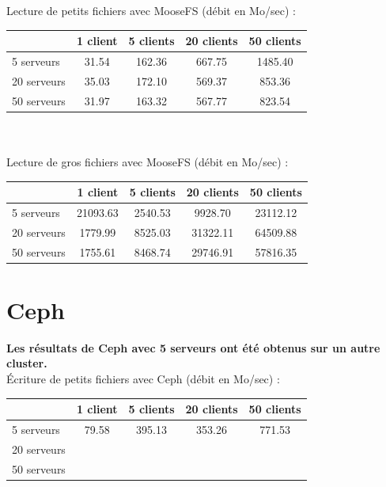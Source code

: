 \documentclass[12pt]{report}
\begin{document}
			Lecture de petits fichiers avec MooseFS (débit en Mo/sec) :

			\begin{tabular}{|l|c|c|c|c|}
				\hline
				& 1 client & 5 clients & 20 clients & 50 clients \\
				\hline
				5 serveurs & 31.54 & 162.36 & 667.75 & 1485.40 \\
				\hline
				20 serveurs & 35.03 & 172.10 & 569.37 & 853.36 \\
				\hline
				50 serveurs & 31.97 & 163.32 & 567.77 & 823.54 \\
				\hline
			\end{tabular}\\\\

			Lecture de gros fichiers avec MooseFS (débit en Mo/sec) :

			\begin{tabular}{|l|c|c|c|c|}
				\hline
				& 1 client & 5 clients & 20 clients & 50 clients \\
				\hline
				5 serveurs & 21093.63 & 2540.53 & 9928.70 & 23112.12 \\
				\hline
				20 serveurs & 1779.99 & 8525.03 & 31322.11 & 64509.88 \\
				\hline
				50 serveurs & 1755.61 & 8468.74 & 29746.91 & 57816.35 \\
				\hline
			\end{tabular}

			\newpage

			\section{Ceph}

			\textbf{Les résultats de Ceph avec 5 serveurs ont été obtenus sur un autre cluster.}\\

			Écriture de petits fichiers avec Ceph (débit en Mo/sec) :

			\begin{tabular}{|l|c|c|c|c|}
				\hline
				& 1 client & 5 clients & 20 clients & 50 clients \\
				\hline
				5 serveurs & 79.58 & 395.13 & 353.26 & 771.53 \\
				\hline
				20 serveurs & & & & \\
				\hline
				50 serveurs & & & & \\
				\hline
			\end{tabular}\\\\
\end{document}
